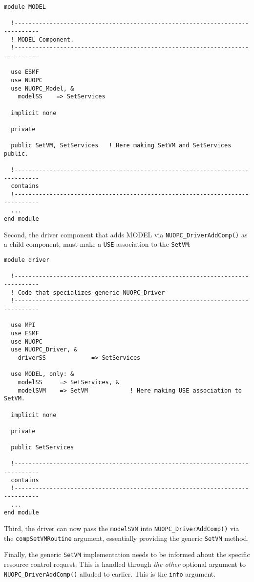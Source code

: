 \begin{verbatim}
module MODEL

  !-----------------------------------------------------------------------------
  ! MODEL Component.
  !-----------------------------------------------------------------------------

  use ESMF
  use NUOPC
  use NUOPC_Model, &
    modelSS    => SetServices

  implicit none

  private

  public SetVM, SetServices   ! Here making SetVM and SetServices public.

  !-----------------------------------------------------------------------------
  contains
  !-----------------------------------------------------------------------------
  ...
end module
\end{verbatim}

Second, the driver component that adds MODEL via {\tt NUOPC\_DriverAddComp()} as a child component, must make a {\tt USE} association to the {\tt SetVM}:

\begin{verbatim}
module driver

  !-----------------------------------------------------------------------------
  ! Code that specializes generic NUOPC_Driver
  !-----------------------------------------------------------------------------

  use MPI
  use ESMF
  use NUOPC
  use NUOPC_Driver, &
    driverSS             => SetServices

  use MODEL, only: &
    modelSS     => SetServices, &
    modelSVM    => SetVM            ! Here making USE association to SetVM.

  implicit none

  private

  public SetServices

  !-----------------------------------------------------------------------------
  contains
  !-----------------------------------------------------------------------------
  ...
end module
\end{verbatim}

Third, the driver can now pass the {\tt modelSVM} into {\tt NUOPC\_DriverAddComp()} via the {\tt compSetVMRoutine} argument, essentially providing the generic {\tt SetVM} method.

Finally, the generic {\tt SetVM} implementation needs to be informed about the specific resource control request. This is handled through {\em the other} optional argument to {\tt NUOPC\_DriverAddComp()} alluded to earlier. This is the {\tt info} argument.

